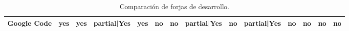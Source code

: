 \begin{landscape}
\begin{table}[H]
{\begin{tabular}{|l|l|l|l|l|l|l|l|l|l|l|l|l|l|}
            \hline Google Code & yes \cellcolor{green} & yes \cellcolor{green} & partial|Yes \cellcolor{yellow} & yes \cellcolor{green} & no \cellcolor{red} & no \cellcolor{red} & partial|Yes \cellcolor{yellow} & no \cellcolor{red} & partial|Yes \cellcolor{yellow} & no \cellcolor{red} & no \cellcolor{red} & no \cellcolor{red} & no \cellcolor{red}\\

            \hline
        \end{tabular}
    }
    \caption{Comparación de forjas de desarrollo.}
    \label{tabla_compartiva}

    \end{table}
\end{landscape}
